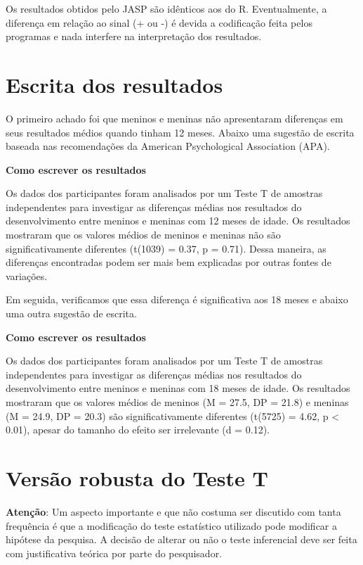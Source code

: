 \documentclass[
]{book}
\begin{document}
Os resultados obtidos pelo JASP são idênticos aos do R. Eventualmente, a diferença em relação ao sinal (+ ou -) é devida a codificação feita pelos programas e nada interfere na interpretação dos resultados.

\hypertarget{escrita-dos-resultados-2}{%
\section{Escrita dos resultados}\label{escrita-dos-resultados-2}}

O primeiro achado foi que meninos e meninas não apresentaram diferenças em seus resultados médios quando tinham 12 meses. Abaixo uma sugestão de escrita baseada nas recomendações da American Psychological Association (APA).

\textbf{Como escrever os resultados}

Os dados dos participantes foram analisados por um Teste T de amostras independentes para investigar as diferenças médias nos resultados do desenvolvimento entre meninos e meninas com 12 meses de idade. Os resultados mostraram que os valores médios de meninos e meninas não são significativamente diferentes (t(1039) = 0.37, p = 0.71). Dessa maneira, as diferenças encontradas podem ser mais bem explicadas por outras fontes de variações.

Em seguida, verificamos que essa diferença é significativa aos 18 meses e abaixo uma outra sugestão de escrita.

\textbf{Como escrever os resultados}

Os dados dos participantes foram analisados por um Teste T de amostras independentes para investigar as diferenças médias nos resultados do desenvolvimento entre meninos e meninas com 18 meses de idade. Os resultados mostraram que os valores médios de meninos (M = 27.5, DP = 21.8) e meninas (M = 24.9, DP = 20.3) são significativamente diferentes (t(5725) = 4.62, p \textless{} 0.01), apesar do tamanho do efeito ser irrelevante (d = 0.12).

\hypertarget{versuxe3o-robusta-do-teste-t}{%
\section{Versão robusta do Teste T}\label{versuxe3o-robusta-do-teste-t}}

\textbf{Atenção}: Um aspecto importante e que não costuma ser discutido com tanta frequência é que a modificação do teste estatístico utilizado pode modificar a hipótese da pesquisa. A decisão de alterar ou não o teste inferencial deve ser feita com justificativa teórica por parte do pesquisador.
\end{document}
